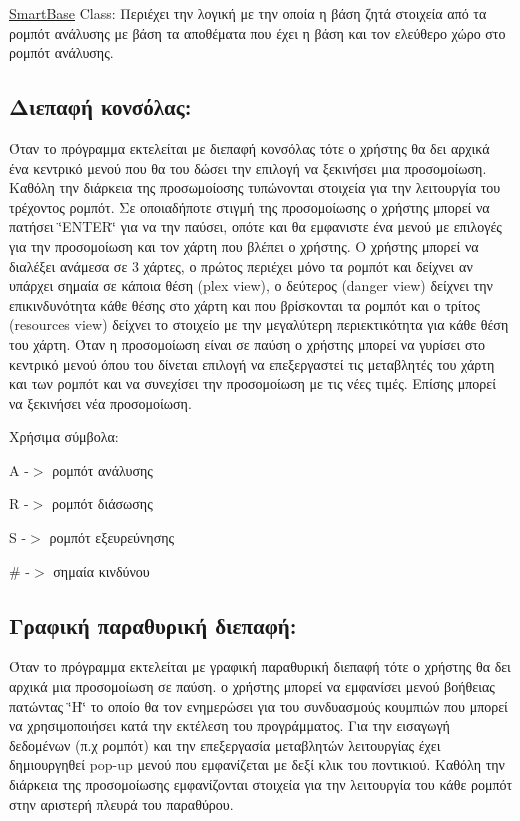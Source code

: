 \hyperlink{class_smart_base}{Smart\-Base} Class\-: Περιέχει την λογική με την οποία η βάση ζητά στοιχεία από τα ρομπότ ανάλυσης με βάση τα αποθέματα που έχει η βάση και τον ελεύθερο χώρο στο ρομπότ ανάλυσης.\hypertarget{index_sub1}{}\subsection{Διεπαφή κονσόλας\-:}\label{index_sub1}
Όταν το πρόγραμμα εκτελείται με διεπαφή κονσόλας τότε ο χρήστης θα δει αρχικά ένα κεντρικό μενού που θα του δώσει την επιλογή να ξεκινήσει μια προσομοίωση. Καθόλη την διάρκεια της προσωμοίοσης τυπώνονται στοιχεία για την λειτουργία του τρέχοντος ρομπότ. Σε οποιαδήποτε στιγμή της προσομοίωσης ο χρήστης μπορεί να πατήσει \char`\"{}\-E\-N\-T\-E\-R\char`\"{} για να την παύσει, οπότε και θα εμφανιστε ένα μενού με επιλογές για την προσομοίωση και τον χάρτη που βλέπει ο χρήστης. Ο χρήστης μπορεί να διαλέξει ανάμεσα σε 3 χάρτες, ο πρώτος περιέχει μόνο τα ρομπότ και δείχνει αν υπάρχει σημαία σε κάποια θέση (plex view), ο δεύτερος (danger view) δείχνει την επικινδυνότητα κάθε θέσης στο χάρτη και που βρίσκονται τα ρομπότ και ο τρίτος (resources view) δείχνει το στοιχείο με την μεγαλύτερη περιεκτικότητα για κάθε θέση του χάρτη. Όταν η προσομοίωση είναι σε παύση ο χρήστης μπορεί να γυρίσει στο κεντρικό μενού όπου του δίνεται επιλογή να επεξεργαστεί τις μεταβλητές του χάρτη και των ρομπότ και να συνεχίσει την προσομοίωση με τις νέες τιμές. Επίσης μπορεί να ξεκινήσει νέα προσομοίωση.

Χρήσιμα σύμβολα\-:

Α -\/$>$ ρομπότ ανάλυσης

R -\/$>$ ρομπότ διάσωσης

S -\/$>$ ρομπότ εξευρεύνησης

\# -\/$>$ σημαία κινδύνου\hypertarget{index_sub2}{}\subsection{Γραφική παραθυρική διεπαφή\-:}\label{index_sub2}
Όταν το πρόγραμμα εκτελείται με γραφική παραθυρική διεπαφή τότε ο χρήστης θα δει αρχικά μια προσομοίωση σε παύση. ο χρήστης μπορεί να εμφανίσει μενού βοήθειας πατώντας \char`\"{}\-H\char`\"{} το οποίο θα τον ενημερώσει για του συνδυασμούς κουμπιών που μπορεί να χρησιμοποιήσει κατά την εκτέλεση του προγράμματος. Για την εισαγωγή δεδομένων (π.\-χ ρομπότ) και την επεξεργασία μεταβλητών λειτουργίας έχει δημιουργηθεί pop-\/up μενού που εμφανίζεται με δεξί κλικ του ποντικιού. Καθόλη την διάρκεια της προσομοίωσης εμφανίζονται στοιχεία για την λειτουργία του κάθε ρομπότ στην αριστερή πλευρά του παραθύρου. 